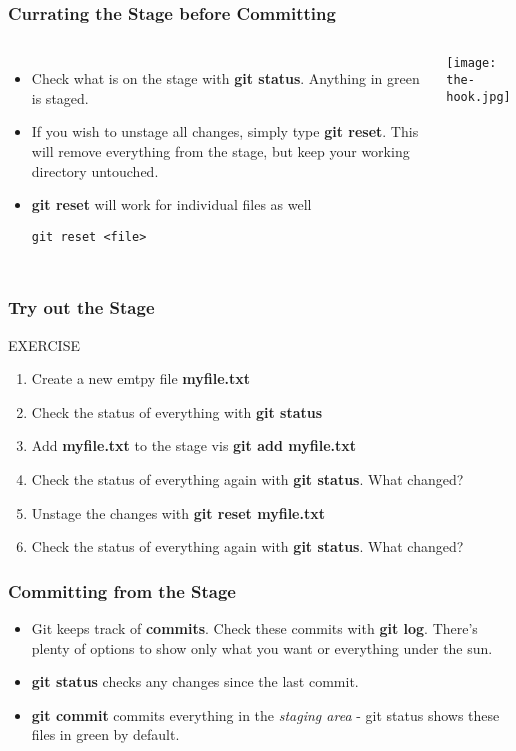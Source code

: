 \documentclass{beamer}
\begin{document}
\begin{frame}[fragile]
\frametitle{Currating the Stage before Committing}
\begin{columns}
\begin{itemize}
\item Check what is on the stage with \textbf{git status}. Anything in \textcolor{dkgreen}{green} is staged.
\item If you wish to unstage all changes, simply type \textbf{git reset}. This will remove everything from the stage, but keep your working directory untouched. 
\item \textbf{git reset} will work for individual files as well
        \begin{lstlisting}
git reset <file>
        \end{lstlisting}
\end{itemize}
\texttt{[image: the-hook.jpg]}
\end{columns}
\end{frame}

\begin{frame}[fragile]
\frametitle{Try out the Stage}
	\begin{block}{EXERCISE}
		\begin{enumerate}
		\item Create a new emtpy file \textbf{myfile.txt}
		\item Check the status of everything with \textbf{git status}
		\item Add \textbf{myfile.txt} to the stage vis \textbf{git add myfile.txt}
		\item Check the status of everything again with \textbf{git status}. What changed?
		\item Unstage the changes with \textbf{git reset myfile.txt}
		\item Check the status of everything again with \textbf{git status}. What changed?
		\end{enumerate}
	\end{block}

\end{frame}


\begin{frame}[fragile]
\frametitle{Committing from the Stage}
\begin{itemize}
\item Git keeps track of \textbf{commits}. Check these commits with \textbf{git log}. There's plenty of options to show only what you want or everything under the sun. 
\item \textbf{git status} checks any changes since the last commit.
\item \textbf{git commit} commits everything in the \textit{staging area} - git status shows these files in {\color{dkgreen}green} by default.
\end{itemize}
\end{frame}
\end{document}
